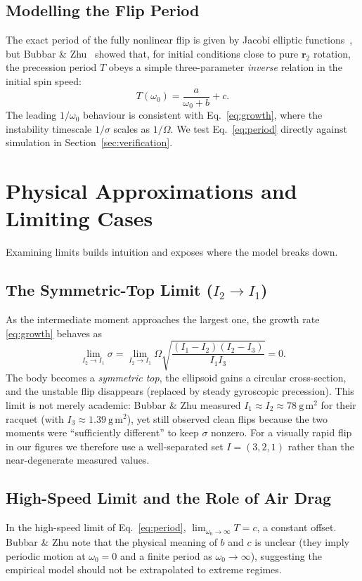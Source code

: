 \documentclass[11pt,letterpaper]{article}
\begin{document}
\subsection{Modelling the Flip Period}
The exact period of the fully nonlinear flip is given by Jacobi elliptic
functions~\cite{peterson2021}, but Bubbar \& Zhu~\cite{bubbar2025} showed that,
for initial conditions close to pure $\mathbf{r}_2$ rotation, the precession
period $T$ obeys a simple three-parameter \emph{inverse} relation in the
initial spin speed:
\begin{equation}\label{eq:period}
T(\omega_0) = \frac{a}{\omega_0 + b} + c .
\end{equation}
The leading $1/\omega_0$ behaviour is consistent with Eq.~\eqref{eq:growth},
where the instability timescale $1/\sigma$ scales as $1/\Omega$. We test
Eq.~\eqref{eq:period} directly against simulation in
Section~\ref{sec:verification}.

\section{Physical Approximations and Limiting Cases}
Examining limits builds intuition and exposes where the model breaks down.

\subsection{The Symmetric-Top Limit ($I_2 \to I_1$)}
As the intermediate moment approaches the largest one, the growth rate
\eqref{eq:growth} behaves as
\begin{equation}
\lim_{I_2 \to I_1}\sigma
= \lim_{I_2 \to I_1}\Omega\sqrt{\frac{(I_1-I_2)(I_2-I_3)}{I_1 I_3}} = 0 .
\end{equation}
The body becomes a \emph{symmetric top}, the ellipsoid gains a circular
cross-section, and the unstable flip disappears (replaced by steady
gyroscopic precession). This limit is not merely academic: Bubbar \& Zhu
measured $I_1 \approx I_2 \approx 78~\mathrm{g\,m^2}$ for their racquet (with
$I_3 \approx 1.39~\mathrm{g\,m^2}$), yet still observed clean flips because the
two moments were ``sufficiently different'' to keep $\sigma$ nonzero. For a
visually rapid flip in our figures we therefore use a well-separated set
$I=(3,2,1)$ rather than the near-degenerate measured values.

\subsection{High-Speed Limit and the Role of Air Drag}
In the high-speed limit of Eq.~\eqref{eq:period}, $\lim_{\omega_0\to\infty}T = c$,
a constant offset. Bubbar \& Zhu note that the physical meaning of $b$ and $c$
is unclear (they imply periodic motion at $\omega_0=0$ and a finite period as
$\omega_0\to\infty$), suggesting the empirical model should not be
extrapolated to extreme regimes.
\end{document}
